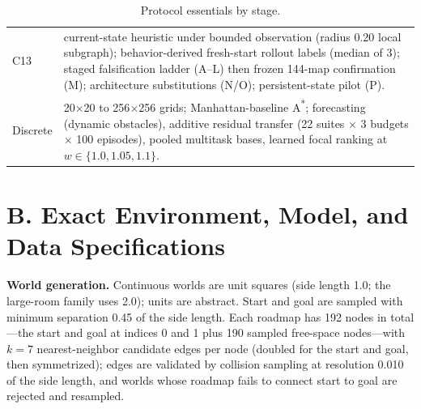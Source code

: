 \documentclass[letterpaper]{article} %
\newcommand{\stage}[1]{\textsc{#1}}
\begin{document}
\begin{table}[t]
\begin{tabular}{@{}lp{5.9cm}@{}}
\stage{C13} & current-state heuristic under bounded observation (radius 0.20 local subgraph); behavior-derived fresh-start rollout labels (median of 3); staged falsification ladder (\stage{A}--\stage{L}) then frozen 144-map confirmation (\stage{M}); architecture substitutions (\stage{N}/\stage{O}); persistent-state pilot (\stage{P}). \\
Discrete & 20$\times$20 to 256$\times$256 grids; Manhattan-baseline A\textsuperscript{*}; forecasting (dynamic obstacles), additive residual transfer (22 suites $\times$ 3 budgets $\times$ 100 episodes), pooled multitask bases, learned focal ranking at $w\in\{1.0,1.05,1.1\}$. \\
\bottomrule
\end{tabular}
\caption{Protocol essentials by stage.}
\label{tab:protocols}
\end{table}

\section{B. Exact Environment, Model, and Data Specifications}

\textbf{World generation.} Continuous worlds are unit squares (side length 1.0; the large-room family uses 2.0); units are abstract. Start and goal are sampled with minimum separation 0.45 of the side length. Each roadmap has 192 nodes in total---the start and goal at indices 0 and 1 plus 190 sampled free-space nodes---with $k{=}7$ nearest-neighbor candidate edges per node (doubled for the start and goal, then symmetrized); edges are validated by collision sampling at resolution 0.010 of the side length, and worlds whose roadmap fails to connect start to goal are rejected and resampled.
\end{document}
